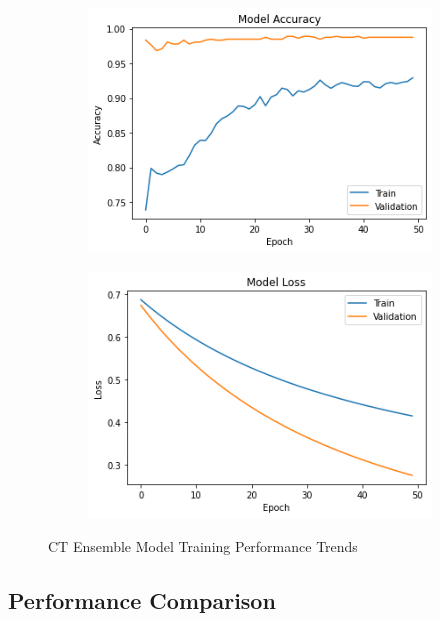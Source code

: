 \begin{figure}[H]
        \begin{subfigure}[b]{0.5\textwidth}
                \includegraphics[width=\linewidth]{Images/CTEnsembleAccuracy.png}
        \end{subfigure}%
        \begin{subfigure}[b]{0.5\textwidth}
                \includegraphics[width=\linewidth]{Images/CTEnsembleLoss.png}
        \end{subfigure}%
        \caption{CT Ensemble Model Training Performance Trends}\label{fig:ctensembleModelTraining}
\end{figure}


\subsection{Performance Comparison}

